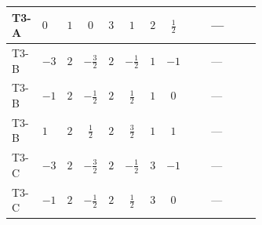 \documentclass[8pt]{article}
\begin{document}
\begin{landscape}
\begin{longtable}{@{}llcccccc >{\raggedright\arraybackslash}p{0.21\linewidth} >{\raggedright\arraybackslash}p{0.21\linewidth} >{\raggedright\arraybackslash}p{0.21\linewidth}@{}}
\midrule
T3-A & $0$ & $1$ & $0$ & $3$ & $1$ & $2$ & $\frac{1}{2}$ & \scriptsize\adjustbox{max width=\linewidth}{$\begin{gathered} -12 {g_2}^2 {\lambda_{12}^{(1)}}\end{gathered}$} & --- & \scriptsize\adjustbox{max width=\linewidth}{$\begin{gathered} -6 {g_1}^2 {\lambda_{12}^{(1)}}\end{gathered}$} \\
\midrule
T3-B & $-3$ & $2$ & $-\frac{3}{2}$ & $2$ & $-\frac{1}{2}$ & $1$ & $-1$ & \scriptsize\adjustbox{max width=\linewidth}{$\begin{gathered} -9 {g_2}^2 {\lambda_{12}^{(1)}}\end{gathered}$} & --- & \scriptsize\adjustbox{max width=\linewidth}{$\begin{gathered} -15 {g_1}^2 {\lambda_{12}^{(1)}}\end{gathered}$} \\
\midrule
T3-B & $-1$ & $2$ & $-\frac{1}{2}$ & $2$ & $\frac{1}{2}$ & $1$ & $0$ & \scriptsize\adjustbox{max width=\linewidth}{$\begin{gathered} -9 {g_2}^2 {\lambda_{12}^{(1)}}\end{gathered}$} & --- & \scriptsize\adjustbox{max width=\linewidth}{$\begin{gathered} -3 {g_1}^2 {\lambda_{12}^{(1)}}\end{gathered}$} \\
\midrule
T3-B & $1$ & $2$ & $\frac{1}{2}$ & $2$ & $\frac{3}{2}$ & $1$ & $1$ & \scriptsize\adjustbox{max width=\linewidth}{$\begin{gathered} -9 {g_2}^2 {\lambda_{12}^{(1)}}\end{gathered}$} & --- & \scriptsize\adjustbox{max width=\linewidth}{$\begin{gathered} -15 {g_1}^2 {\lambda_{12}^{(1)}}\end{gathered}$} \\
\midrule
T3-C & $-3$ & $2$ & $-\frac{3}{2}$ & $2$ & $-\frac{1}{2}$ & $3$ & $-1$ & \scriptsize\adjustbox{max width=\linewidth}{$\begin{gathered} -9 {g_2}^2 {\lambda_{12}^{(1)}}\end{gathered}$} & --- & \scriptsize\adjustbox{max width=\linewidth}{$\begin{gathered} -15 {g_1}^2 {\lambda_{12}^{(1)}}\end{gathered}$} \\
\midrule
T3-C & $-1$ & $2$ & $-\frac{1}{2}$ & $2$ & $\frac{1}{2}$ & $3$ & $0$ & \scriptsize\adjustbox{max width=\linewidth}{$\begin{gathered} -9 {g_2}^2 {\lambda_{12}^{(1)}}\end{gathered}$} & --- & \scriptsize\adjustbox{max width=\linewidth}{$\begin{gathered} -3 {g_1}^2 {\lambda_{12}^{(1)}}\end{gathered}$} \\

\end{longtable}
\end{landscape}
\end{document}
